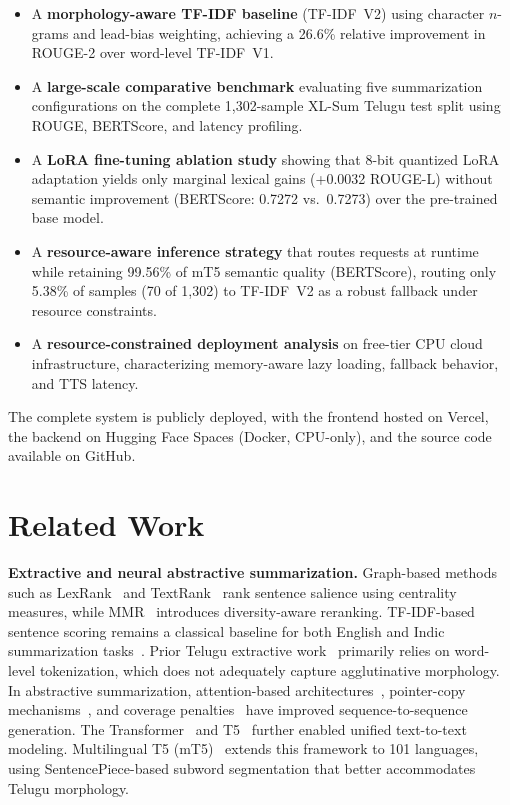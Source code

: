 \documentclass[runningheads]{llncs}
\begin{document}
\begin{itemize}[leftmargin=*,itemsep=1pt,topsep=2pt]
  \item A \textbf{morphology-aware TF-IDF baseline} (TF-IDF~V2) using character $n$-grams and lead-bias weighting, achieving a 26.6\% relative improvement in ROUGE-2 over word-level TF-IDF~V1.
  
  \item A \textbf{large-scale comparative benchmark} evaluating five summarization configurations on the complete 1,302-sample XL-Sum Telugu test split using ROUGE, BERTScore, and latency profiling.
  
  \item A \textbf{LoRA fine-tuning ablation study} showing that 8-bit quantized LoRA adaptation yields only marginal lexical gains (+0.0032 ROUGE-L) without semantic improvement (BERTScore: 0.7272 vs.\ 0.7273) over the pre-trained base model.
  
  \item A \textbf{resource-aware inference strategy} that routes requests at runtime while retaining 99.56\% of mT5 semantic quality (BERTScore), routing only 5.38\% of samples (70 of 1,302) to TF-IDF~V2 as a robust fallback under resource constraints.
  
  \item A \textbf{resource-constrained deployment analysis} on free-tier CPU cloud infrastructure, characterizing memory-aware lazy loading, fallback behavior, and TTS latency.
\end{itemize}

The complete system is publicly deployed, with the frontend hosted on Vercel, the backend on Hugging Face Spaces (Docker, CPU-only), and the source code available on GitHub.
\section{Related Work}

\textbf{Extractive and neural abstractive summarization.}
Graph-based methods such as LexRank~\cite{erkan2004lexrank} and TextRank~\cite{mihalcea2004textrank} rank sentence salience using centrality measures, while MMR~\cite{carbonell1998use} introduces diversity-aware reranking. TF-IDF-based sentence scoring remains a classical baseline for both English and Indic summarization tasks~\cite{joshi2020text}. Prior Telugu extractive work~\cite{anandbabu2023extractive} primarily relies on word-level tokenization, which does not adequately capture agglutinative morphology. In abstractive summarization, attention-based architectures~\cite{rush2015neural}, pointer-copy mechanisms~\cite{nallapati2016abstractive}, and coverage penalties~\cite{see2017get} have improved sequence-to-sequence generation. The Transformer~\cite{vaswani2017attention} and T5~\cite{raffel2020exploring} further enabled unified text-to-text modeling. Multilingual T5 (mT5)~\cite{xue2021mt5} extends this framework to 101 languages, using SentencePiece-based subword segmentation that better accommodates Telugu morphology.
\end{document}

